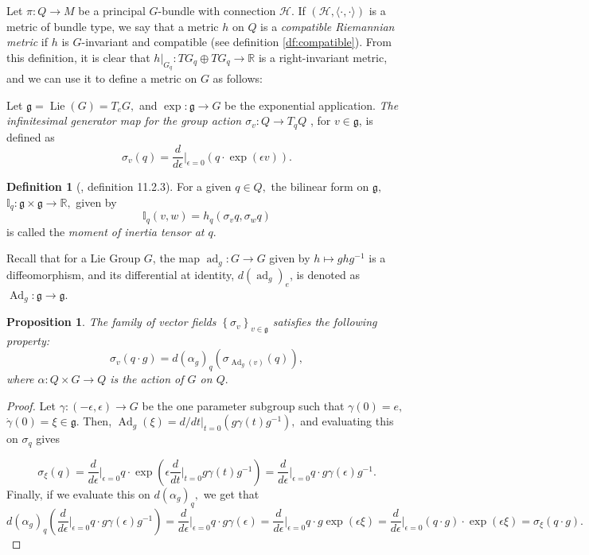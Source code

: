\documentclass[12pt, letterpaper, reqno]{amsart}
\theoremstyle{definition}
\newtheorem{df}{Definition}
\theoremstyle{plain}
\newtheorem{prop}{Proposition}
\theoremstyle{remark}
\begin{document}
Let $ \pi: Q \rightarrow M $ be a principal $ G $-bundle with connection $ \mathcal{H}. $ If $ (\mathcal{H},\langle\cdot,\cdot\rangle) $ is a metric of bundle type, we say that a metric $ h $ on $ Q $ is a \textit{compatible Riemannian metric} if $ h $ is $ G $-invariant and compatible (see definition \ref{df:compatible}). From this definition, it is clear that $ h|_{G_q}: TG_q \oplus TG_q \rightarrow \mathbb{R} $ is a right-invariant metric, and we can use it to define a metric on $ G $ as follows:

Let $ \mathfrak{g}= \operatorname{Lie}(G)=T_eG, $ and $ \operatorname{exp} : \mathfrak{g}\rightarrow G $ be the exponential application. \textit{The infinitesimal generator map for the group action $ \sigma_v: Q\rightarrow T_qQ $ }, for $ v \in \mathfrak{g} $,  is defined as
$$ \sigma_v(q) = \frac{d}{d\epsilon} \Big|_{\epsilon=0} \left( q\cdot \operatorname{exp} (\epsilon v) \right).$$ 

\begin{df}[\cite{montgomery2002tour}, definition 11.2.3]
	For a given $ q\in Q, $ the bilinear form on $ \mathfrak{g}, $ $ \mathbb{I}_q: \mathfrak{g}\times \mathfrak{g}\rightarrow \mathbb{R}, $ given by
	$$ \mathbb{I}_q(v,w) = h_q(\sigma_v q, \sigma_w q) $$ 
	is called the \textit{moment of inertia tensor at $ q. $ } 
\end{df}

Recall that for a Lie Group $ G $, the map $ \operatorname{ad}_g: G \rightarrow G  $ given by $ h\mapsto ghg^{-1} $ is a diffeomorphism, and its differential at identity, $ d( \operatorname{ad}_g )_e $,  is denoted as $ \operatorname{Ad}_g: \mathfrak{g}\rightarrow \mathfrak{g} $. 

\begin{prop}
	The family of vector fields $ \left\{ \sigma_v \right\}_{v\in \mathfrak{g}} $ satisfies the following property:
	$$ \sigma_v(q\cdot g) = d(\alpha_g)_q\left(\sigma_{\operatorname{Ad}_g(v)}(q)\right) ,$$ 
	where $ \alpha: Q\times G \rightarrow Q $ is the action of $ G $ on $ Q. $ 
\end{prop}
\begin{proof}
	Let $ \gamma:(-\epsilon,\epsilon) \rightarrow G $ be the one parameter subgroup such that $ \gamma(0)=e, $ $ \dot{\gamma}(0)=\xi\in \mathfrak{g}. $ Then, $ \operatorname{Ad}_g \left( \xi \right) = d/dt|_{t=0}(g\gamma(t)g^{-1}), $ and evaluating this on $ \sigma_q $ gives

	$$ \sigma_{\xi}(q) = \frac{d}{d\epsilon} \Big|_{\epsilon=0} q\cdot \operatorname{exp} \left( \epsilon \frac{d}{dt} \Big|_{t=0} g\gamma(t)g^{-1} \right) = \frac{d}{d\epsilon} \Big|_{\epsilon=0} q\cdot g\gamma(\epsilon)g^{-1}. $$ 
	Finally, if we evaluate this on $ d(\alpha_g)_q, $ we get that
	\begin{dmath*}
		d(\alpha_g)_q \left( \frac{d}{d\epsilon} \Big|_{\epsilon=0} q\cdot g\gamma(\epsilon)g^{-1} \right) = \frac{d}{d\epsilon} \Big|_{\epsilon=0}  q \cdot g\gamma(\epsilon)= \frac{d}{d\epsilon} \Big|_{\epsilon=0} q\cdot g \operatorname{exp} \left( \epsilon\xi \right) = \frac{d}{d\epsilon} \Big|_{\epsilon=0} (q\cdot g) \cdot \operatorname{exp} (\epsilon\xi)= \sigma_\xi(q\cdot g). 
	\end{dmath*}
\end{proof}
\end{document}
